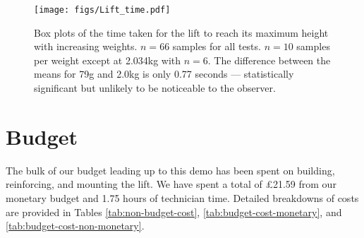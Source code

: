 \documentclass{article}
\begin{document}
\begin{figure}
  \begin{center}
    \texttt{[image: figs/Lift\_time.pdf]}
    \caption{Box plots of the time taken for the lift to reach its maximum height with increasing weights. $n = 66$ samples for all tests. $n = 10$ samples per weight except at 2.034kg with $n = 6$. The difference between the means for 79g and 2.0kg is only 0.77 seconds --- statistically significant but unlikely to be noticeable to the observer.}
    \label{fig:weight-testing}
  \end{center}
\end{figure}

\section{Budget}
The bulk of our budget leading up to this demo has been spent on building, reinforcing, and mounting the lift. We have spent a total of \pounds 21.59 from our monetary budget and 1.75 hours of technician time. Detailed breakdowns of costs are provided in Tables \ref{tab:non-budget-cost}, \ref{tab:budget-cost-monetary}, and \ref{tab:budget-cost-non-monetary}.

\begin{table}[h]
\begin{center}
\caption{Non-budgeted monetary costs at demo \demoNumber.}
\label{tab:non-budget-cost}
\end{center}
\end{table}
\end{document}
